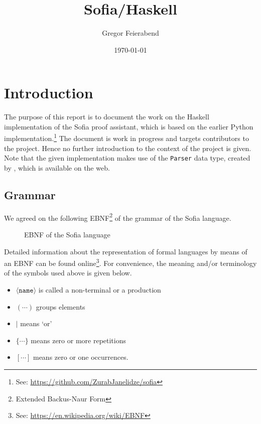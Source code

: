 \documentclass[notitlepage]{report}
\title{Sofia/Haskell}
\author{Gregor Feierabend}
\date{\today}
\newcommand\m[1]{\texttt{#1}}
\begin{document}

\maketitle

\begingroup
\let\clearpage\relax
\tableofcontents
\endgroup

\chapter{Introduction}
The purpose of this report is to document the work on the Haskell
implementation of the Sofia proof assistant, which is based on the earlier
Python implementation.\footnote{See: %
\url{https://github.com/ZurabJanelidze/sofia}}
The document is work in progress and targets contributors to the project. Hence
no further introduction to the context of the project is given. Note that the
given implementation makes use of the \m{Parser} data type, created by
\textcite{Hutton}, which is available on the web.


\section{Grammar}
We agreed on the following EBNF\footnote{Extended Backus-Naur Form} of the
grammar of the Sofia language.
\begin{figure}[h!]
    {\renewcommand{\arraystretch}{2.0}
    }
    \caption{EBNF of the Sofia language}\label{fig:EBNFsofia}
\end{figure}

Detailed information about the representation of formal languages by means of an
EBNF can be found online\footnote{%
See: \url{https://en.wikipedia.org/wiki/EBNF}}. For convenience,
the meaning and/or terminology of the symbols used above is given below.
\begin{multicols}{2}
\begin{itemize}
    \item $\langle\texttt{name}\rangle$ is called a non-terminal or a production
    \item $(\cdots)$ groups elements
    \item $|$ means `or'
    \item $\{\cdots\}$ means zero or more repetitions
    \item $[\cdots]$ means zero or one occurrences.
\end{itemize}
\end{multicols}
\end{document}
